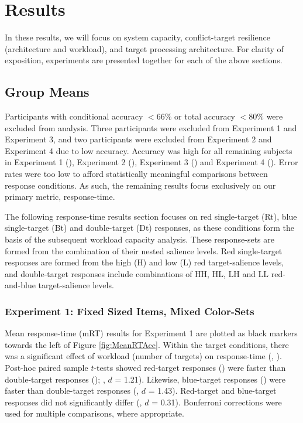 \section{Results}
In these results, we will focus on system capacity, conflict-target resilience (\ie architecture and workload), and target processing architecture. For clarity of exposition, experiments are presented together for each of the above sections.

\subsection{Group Means}
Participants with conditional accuracy $< 66\%$ or total accuracy $< 80\%$ were excluded from analysis. Three participants were excluded from Experiment 1 and Experiment 3, and two participants were excluded from Experiment 2 and Experiment 4 due to low accuracy. Accuracy was high for all remaining subjects in Experiment 1 (), Experiment 2 (), Experiment 3 () and Experiment 4 (). Error rates were too low to afford statistically meaningful comparisons between response conditions. As such, the remaining results focus exclusively on our primary metric, response-time.

The following response-time results section focuses on red single-target (Rt), blue single-target (Bt) and double-target (Dt) responses, as these conditions form the basis of the subsequent workload capacity analysis. These response-sets are formed from the combination of their nested salience levels. Red single-target responses are formed from the high (H) and low (L) red target-salience levels, and double-target responses include combinations of HH, HL, LH and LL red-and-blue target-salience levels.

\subsubsection{Experiment 1: Fixed Sized Items, Mixed Color-Sets}
Mean response-time (mRT) results for Experiment 1 are plotted as black markers towards the left of Figure \ref{fig:MeanRTAcc}. Within the target conditions, there was a significant effect of workload (number of targets) on response-time (, ). Post-hoc paired sample $t$-tests showed red-target responses () were faster than double-target responses (); , $d$ = 1.21). Likewise, blue-target responses () were faster than double-target responses (, $d$ = 1.43). Red-target and blue-target responses did not significantly differ (, $d$ = 0.31). Bonferroni corrections were used for multiple comparisons, where appropriate. 

